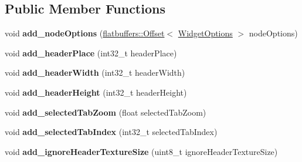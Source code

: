 \subsection*{Public Member Functions}
\begin{DoxyCompactItemize}
\item 
\mbox{\label{structflatbuffers_1_1TabControlOptionBuilder_af024200c15154f958b2b687c958d2984}} 
void {\bfseries add\+\_\+node\+Options} (\hyperlink{structflatbuffers_1_1Offset}{flatbuffers\+::\+Offset}$<$ \hyperlink{structflatbuffers_1_1WidgetOptions}{Widget\+Options} $>$ node\+Options)
\item 
\mbox{\label{structflatbuffers_1_1TabControlOptionBuilder_afd9e47ec69e0a77d83c3a9ec3064096a}} 
void {\bfseries add\+\_\+header\+Place} (int32\+\_\+t header\+Place)
\item 
\mbox{\label{structflatbuffers_1_1TabControlOptionBuilder_a247e2a47170197942dc4ab1cce6c4898}} 
void {\bfseries add\+\_\+header\+Width} (int32\+\_\+t header\+Width)
\item 
\mbox{\label{structflatbuffers_1_1TabControlOptionBuilder_adb55a3c8529fe12a7b9188945b1b83c6}} 
void {\bfseries add\+\_\+header\+Height} (int32\+\_\+t header\+Height)
\item 
\mbox{\label{structflatbuffers_1_1TabControlOptionBuilder_a41c5bf7bbc5d850158c815898278f0e6}} 
void {\bfseries add\+\_\+selected\+Tab\+Zoom} (float selected\+Tab\+Zoom)
\item 
\mbox{\label{structflatbuffers_1_1TabControlOptionBuilder_a736fb2f91d205082cf4209675c87f8f8}} 
void {\bfseries add\+\_\+selected\+Tab\+Index} (int32\+\_\+t selected\+Tab\+Index)
\item 
\mbox{\label{structflatbuffers_1_1TabControlOptionBuilder_ad3d329473b2af67e84c1e1a8f8039360}} 
void {\bfseries add\+\_\+ignore\+Header\+Texture\+Size} (uint8\+\_\+t ignore\+Header\+Texture\+Size)
\item 

\end{DoxyCompactItemize}
